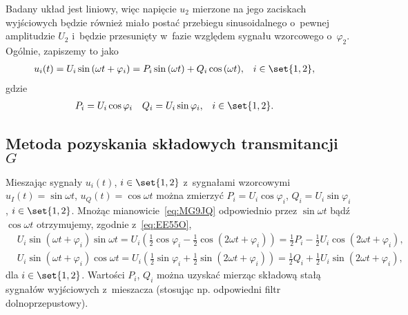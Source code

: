 \documentclass[paper=a4,DIV=12]{tfa}
\begin{document}
Badany układ jest liniowy, więc napięcie $u_2$ mierzone na
jego zaciskach wyjściowych będzie również miało postać przebiegu sinusoidalnego
o~pewnej amplitudzie $U_2$ i~będzie przesunięty w~fazie względem sygnału
wzorcowego o~$\varphi_2$. Ogólnie, zapiszemy to jako
\begin{align}
  & u_i(t) = U_i \sin{(\omega t + \varphi_i)}
         = P_i \sin{(\omega t)} + Q_i \cos{(\omega t)},
  &
  & i \in \set{1, 2}, &
  \label{eq:MG9JQ}
\end{align}
gdzie
\begin{align}
  & P_i = U_i \cos{\varphi_i} &
  & Q_i = U_i \sin{\varphi_i}, &
  & i \in \set{1, 2}. &
  \label{eq:9UTG8}
\end{align}

\subsection{Metoda pozyskania składowych transmitancji $G$}
\label{sec:TV9TW}

Mieszając sygnały $u_i(t)$, $i \in \set{1, 2}$ z~sygnałami wzorcowymi $u_I(t) =
\sin{\omega t}$, $u_Q(t) = \cos{\omega t}$ można zmierzyć $P_i = U_i
\cos{\varphi_i}$, $Q_i = U_i \sin {\varphi_i}$, $i \in \set{1, 2}$. Mnożąc
mianowicie~\eqref{eq:MG9JQ} odpowiednio przez $\sin{\omega t}$ bądź
$\cos{\omega t}$ otrzymujemy, zgodnie z~\eqref{eq:EE55O},
\begin{subequations}
  \begin{align}
    &  U_i \sin{(\omega t + \varphi_i)}\sin{\omega t}
      = U_i \left(
        \frac{1}{2}\cos{\varphi_i} - \frac{1}{2}\cos{(2 \omega t + \varphi_i)}
      \right)
      = \frac{1}{2} P_i -
        \frac{1}{2} U_i \cos{(2 \omega t + \varphi_i)},
    &
    \label{eq:S0V86}
    \\
    & U_i \sin{(\omega t + \varphi_i)}\cos{\omega t}
      = U_i \left(
        \frac{1}{2}\sin{\varphi_i} + \frac{1}{2}\sin{(2 \omega t + \varphi_i)}
      \right)
      = \frac{1}{2} Q_i +
        \frac{1}{2} U_i \sin{(2 \omega t + \varphi_i)},
    &
    \label{eq:IU4JA}
  \end{align}
  \label{eq:M1ICA}
\end{subequations}
dla $i \in \set{1, 2}$. Wartości $P_i$, $Q_i$ można
uzyskać mierząc składową stałą sygnałów wyjściowych z~mieszacza (stosując
np. odpowiedni filtr dolnoprzepustowy).
\end{document}
